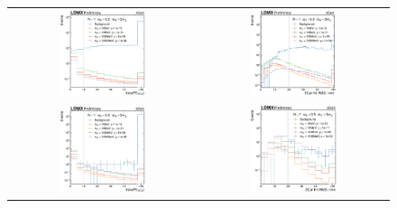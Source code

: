 \begin{figure}
    \centering
    \begin{tabular}{cc}
        \includegraphics[width=0.48\textwidth]{figures/ldmx/analysis/nm1-hcal-max-pe-4gev-1e13norm.pdf} &
        \includegraphics[width=0.48\textwidth]{figures/ldmx/analysis/nm1-ecal-rms-4gev-1e13norm.pdf} \\
        \includegraphics[width=0.48\textwidth]{figures/ldmx/analysis/nm1-hcal-max-pe-8gev-1e13norm.pdf} &
        \includegraphics[width=0.48\textwidth]{figures/ldmx/analysis/nm1-ecal-rms-8gev-1e13norm.pdf} \\

\end{tabular}
\end{figure}

